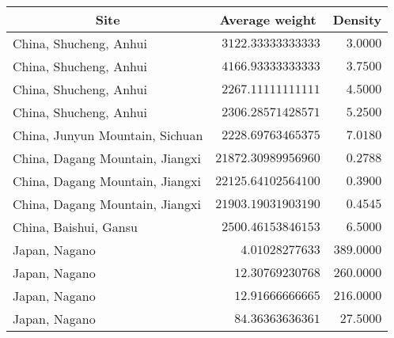 \begin{tabular}{lrr} \toprule
\multicolumn{1}{c}{Site} & \multicolumn{1}{c}{Average weight} & \multicolumn{1}{c}{Density} \\\midrule
China, Shucheng, Anhui          & $3122.33333333333$  & $3.0000$   \\
China, Shucheng, Anhui          & $4166.93333333333$  & $3.7500$   \\
China, Shucheng, Anhui          & $2267.11111111111$  & $4.5000$   \\
China, Shucheng, Anhui          & $2306.28571428571$  & $5.2500$   \\
China, Junyun Mountain, Sichuan & $2228.69763465375$  & $7.0180$   \\
China, Dagang Mountain, Jiangxi & $21872.30989956960$ & $0.2788$   \\
China, Dagang Mountain, Jiangxi & $22125.64102564100$ & $0.3900$   \\
China, Dagang Mountain, Jiangxi & $21903.19031903190$ & $0.4545$   \\
China, Baishui, Gansu           & $2500.46153846153$  & $6.5000$   \\
Japan, Nagano                   & $4.01028277633$     & $389.0000$ \\
Japan, Nagano                   & $12.30769230768$    & $260.0000$ \\
Japan, Nagano                   & $12.91666666665$    & $216.0000$ \\
Japan, Nagano                   & $84.36363636361$    & $27.5000$  \\\bottomrule
\end{tabular}
